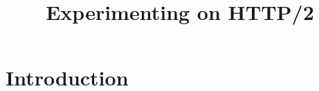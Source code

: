 \documentclass[12pt, notitlepage]{article}
\begin{document}
\title{Experimenting on HTTP/2}
\maketitle
\section{Introduction}
\end{document}
